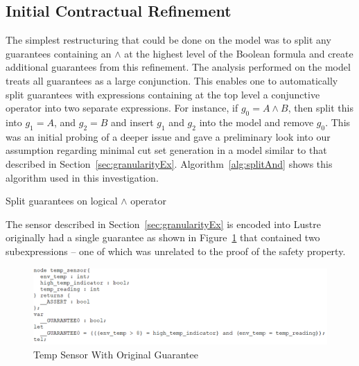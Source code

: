 \subsection{Initial Contractual Refinement}
\label{sec:granularityANDAlg}
The simplest restructuring that could be done on the model was to split any guarantees containing an $\land$ at the highest level of the Boolean formula and create additional guarantees from this refinement. The analysis performed on the model treats all guarantees as a large conjunction. This enables one to automatically split guarantees with expressions containing at the top level a conjunctive operator into two separate expressions. For instance, if $g_0 = A \land B$, then split this into $g_1 = A$, and $g_2 = B$ and insert $g_1$ and $g_2$ into the model and remove $g_0$. This was an initial probing of a deeper issue and gave a preliminary look into our assumption regarding minimal cut set generation in a model similar to that described in Section~\ref{sec:granularityEx}. Algorithm~\ref{alg:splitAnd} shows this algorithm used in this investigation. 

\begin{algorithm}[h]

	\caption{Split guarantees on logical $\land$ operator}
	\label{alg:splitAnd}
\end{algorithm}

The sensor described in Section~\ref{sec:granularityEx} is encoded into Lustre originally had a single guarantee as shown in Figure~\ref{fig:lustreOneGuar} that contained two subexpressions -- one of which was unrelated to the proof of the safety property.

\begin{figure}[h!]
\begin{center}
\includegraphics[width=1.0\textwidth]{images/lustreTwoGuar.PNG}
\caption{Temp Sensor With Original Guarantee} \label{fig:lustreOneGuar}
\end{center}
\end{figure}
 
